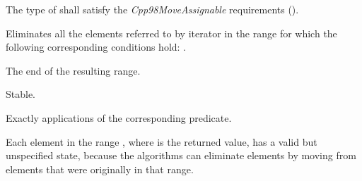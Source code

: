 \begin{itemdescr}
\pnum
\requires
The type of
shall satisfy the \textit{Cpp98MoveAssignable}
requirements ().

\pnum
\effects
Eliminates all the elements referred to by iterator
in the range 
for which the following corresponding conditions hold:
.

\pnum
\returns
The end of the resulting range.

\pnum
\remarks Stable.

\pnum
\complexity
Exactly
applications of the corresponding predicate.

\pnum
\begin{note}
Each element in the range , where  is
the returned value, has a valid but unspecified state, because the algorithms
can eliminate elements by moving from elements that were originally
in that range.
\end{note}
\end{itemdescr}

